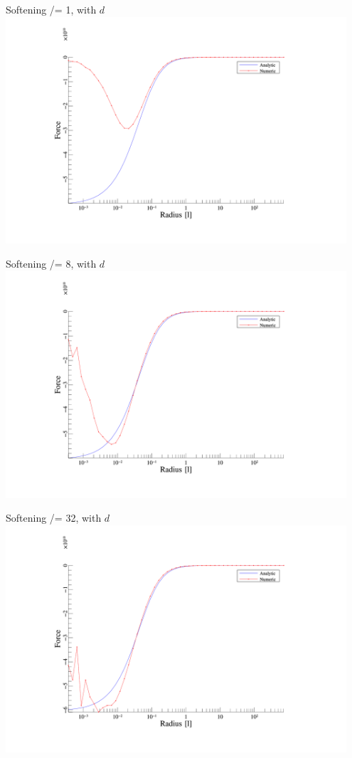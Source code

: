 \begin{frame}{Softening /= 1, with $d$}
	\includegraphics[width=0.95\textwidth]{figures/plots/forces_d_1.png}
\end{frame}

\begin{frame}{Softening /= 8, with $d$}
	\includegraphics[width=0.95\textwidth]{figures/plots/forces_d_8.png}
\end{frame}

\begin{frame}{Softening /= 32, with $d$}
	\includegraphics[width=0.95\textwidth]{figures/plots/forces_d_32.png}
\end{frame}

